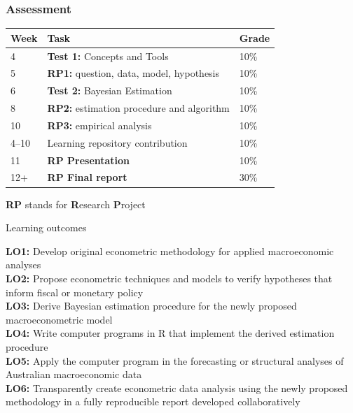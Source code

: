 \documentclass[notes,blackandwhite,mathsans]{beamer}
\begin{document}
\begin{frame}
\frametitle{Assessment}

\begin{center}
\begin{tabular}{ l l l }
\toprule 
Week & Task & Grade \\[1ex]
\midrule
4 & \textbf{Test 1:} Concepts and Tools & 10\% \\ [1ex]
5 & \textbf{RP1:} question, data, model, hypothesis & 10\% \\[1ex]
6 & \textbf{Test 2:} Bayesian Estimation & 10\% \\[1ex]
8 & \textbf{RP2:} estimation procedure and algorithm & 10\% \\
10 & \textbf{RP3:} empirical analysis & 10\% \\[1ex]
4--10 & Learning repository contribution & 10\% \\ [1ex]
11 & \textbf{RP Presentation} &  10\% \\[1ex]
12+ & \textbf{RP Final report} & 30\%   \\[1ex]
\bottomrule
\end{tabular}

\smallskip\noindent \textbf{RP} stands for \textbf{R}esearch \textbf{P}roject
\end{center}

\end{frame}



\begin{frame}{Learning outcomes}

\textbf{LO1:} Develop original econometric methodology for applied macroeconomic analyses\\[1ex]
\textbf{LO2:} Propose econometric techniques and models to verify hypotheses that inform fiscal or monetary policy\\[1ex]
\textbf{LO3:} Derive Bayesian estimation procedure for the newly proposed macroeconometric model\\[1ex]
\textbf{LO4:} Write computer programs in R that implement the derived estimation procedure\\[1ex]
\textbf{LO5:} Apply the computer program in the forecasting or structural analyses of Australian macroeconomic data\\[1ex]
\textbf{LO6:} Transparently create econometric data analysis using the newly proposed methodology in a fully reproducible report developed collaboratively

\end{frame}
\end{document}
